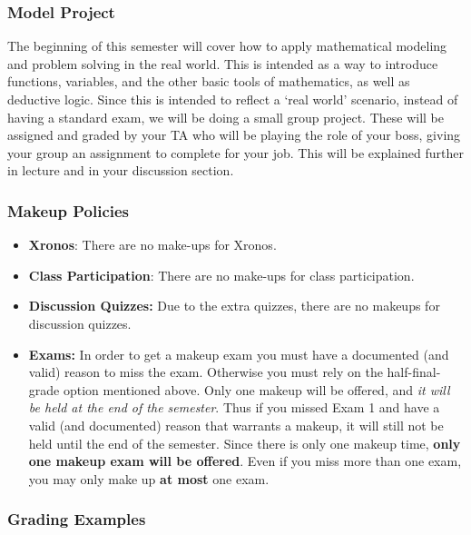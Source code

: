 \documentclass{ximeraXloud}
\begin{document}
\subsubsection*{Model Project}
    The beginning of this semester will cover how to apply mathematical modeling and problem solving in the real world. This is intended as a way to introduce functions, variables, and the other basic tools of mathematics, as well as deductive logic. Since this is intended to reflect a `real world' scenario, instead of having a standard exam, we will be doing a small group project. These will be assigned and graded by your TA who will be playing the role of your boss, giving your group an assignment to complete for your job. This will be explained further in lecture and in your discussion section.
            
\subsubsection*{Makeup Policies} %

    \begin{itemize}
        \item{\textbf{Xronos}:} There are no make-ups for Xronos.
        \item{\textbf{Class Participation}:} There are no make-ups for class participation.
        \item{\textbf{Discussion Quizzes:}} Due to the extra quizzes, there are no makeups for discussion quizzes.
        \item{\textbf{Exams:}} In order to get a makeup exam you must have a documented (and valid) reason to miss the exam. Otherwise you must rely on the half-final-grade option mentioned above. Only one makeup will be offered, and \textit{it will be held at the end of the semester}. Thus if you missed Exam 1 and have a valid (and documented) reason that warrants a makeup, it will still not be held until the end of the semester. Since there is only one makeup time, \textbf{only one makeup exam will be offered}. Even if you miss more than one exam, you may only make up \textbf{at most} one exam.
    \end{itemize}

\subsubsection*{Grading Examples}
\end{document}
